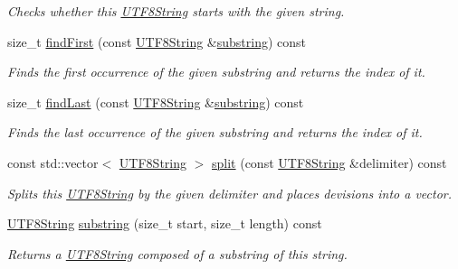 \begin{DoxyCompactItemize}
\begin{DoxyCompactList}\small\item\em Checks whether this \hyperlink{classchaos_1_1str_1_1_u_t_f8_string}{U\-T\-F8\-String} starts with the given string. \end{DoxyCompactList}\item 
size\-\_\-t \hyperlink{classchaos_1_1str_1_1_u_t_f8_string_ac74d0b63abf982070756af2731af5820}{find\-First} (const \hyperlink{classchaos_1_1str_1_1_u_t_f8_string}{U\-T\-F8\-String} \&\hyperlink{classchaos_1_1str_1_1_u_t_f8_string_a2d50ab58715264ae175f521816bf670c}{substring}) const 
\begin{DoxyCompactList}\small\item\em Finds the first occurrence of the given substring and returns the index of it. \end{DoxyCompactList}\item 
size\-\_\-t \hyperlink{classchaos_1_1str_1_1_u_t_f8_string_a7e077146466c7cbe0647bc1b0d1744ec}{find\-Last} (const \hyperlink{classchaos_1_1str_1_1_u_t_f8_string}{U\-T\-F8\-String} \&\hyperlink{classchaos_1_1str_1_1_u_t_f8_string_a2d50ab58715264ae175f521816bf670c}{substring}) const 
\begin{DoxyCompactList}\small\item\em Finds the last occurrence of the given substring and returns the index of it. \end{DoxyCompactList}\item 
const std\-::vector$<$ \hyperlink{classchaos_1_1str_1_1_u_t_f8_string}{U\-T\-F8\-String} $>$ \hyperlink{classchaos_1_1str_1_1_u_t_f8_string_ac5da4c989f6394c38b0fb82a252099db}{split} (const \hyperlink{classchaos_1_1str_1_1_u_t_f8_string}{U\-T\-F8\-String} \&delimiter) const 
\begin{DoxyCompactList}\small\item\em Splits this \hyperlink{classchaos_1_1str_1_1_u_t_f8_string}{U\-T\-F8\-String} by the given delimiter and places devisions into a vector. \end{DoxyCompactList}\item 
\hyperlink{classchaos_1_1str_1_1_u_t_f8_string}{U\-T\-F8\-String} \hyperlink{classchaos_1_1str_1_1_u_t_f8_string_a2d50ab58715264ae175f521816bf670c}{substring} (size\-\_\-t start, size\-\_\-t length) const 
\begin{DoxyCompactList}\small\item\em Returns a \hyperlink{classchaos_1_1str_1_1_u_t_f8_string}{U\-T\-F8\-String} composed of a substring of this string. \end{DoxyCompactList}\item 

\end{DoxyCompactItemize}
